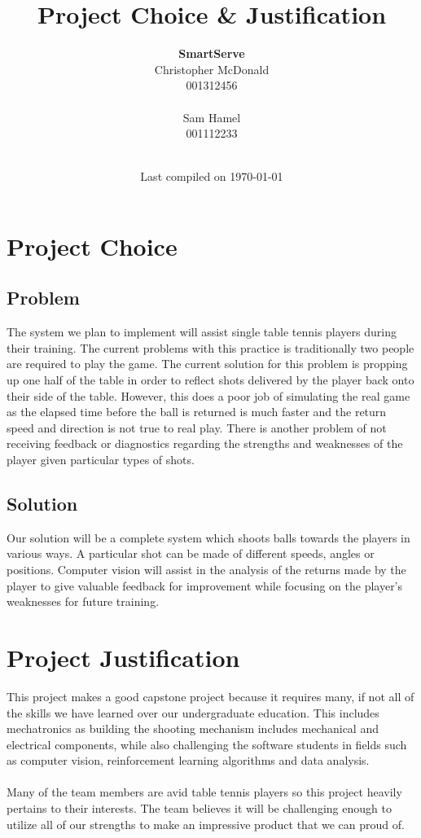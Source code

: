 \documentclass[11pt, oneside]{article}
\title{Project Choice \& Justification}
\author{
\textbf{SmartServe}\\
Christopher McDonald \\ 001312456 \\ \\ 
Sam Hamel \\ 001112233 \\ \\
}
\date{Last compiled on \today}
\begin{document}
\maketitle
\section*{Project Choice}
\subsection*{Problem}
The system we plan to implement will assist single table tennis players during their training. The current problems with this practice is traditionally two people are required to play the game. The current solution for this problem is propping up one half of the table in order to reflect shots delivered by the player back onto their side of the table. However, this does a poor job of simulating the real game as the elapsed time before the ball is returned is much faster and the return speed and direction is not true to real play. There is another problem of not receiving feedback or diagnostics regarding the strengths and weaknesses of the player given particular types of shots.
\subsection*{Solution}
Our solution will be a complete system which shoots balls towards the players in various ways. A particular shot can be made of different speeds, angles or positions. Computer vision will assist in the analysis of the returns made by the player to give valuable feedback for improvement while focusing on the player's weaknesses for future training.
\section*{Project Justification}
This project makes a good capstone project because it requires many, if not all of the skills we have learned over our undergraduate education. This includes mechatronics as building the shooting mechanism includes mechanical and electrical components, while also challenging the software students in fields such as computer vision, reinforcement learning algorithms and data analysis. \\ \\
Many of the team members are avid table tennis players so this project heavily pertains to their interests. The team believes it will be challenging enough to utilize all of our strengths to make an impressive product that we can proud of. 
\end{document}
